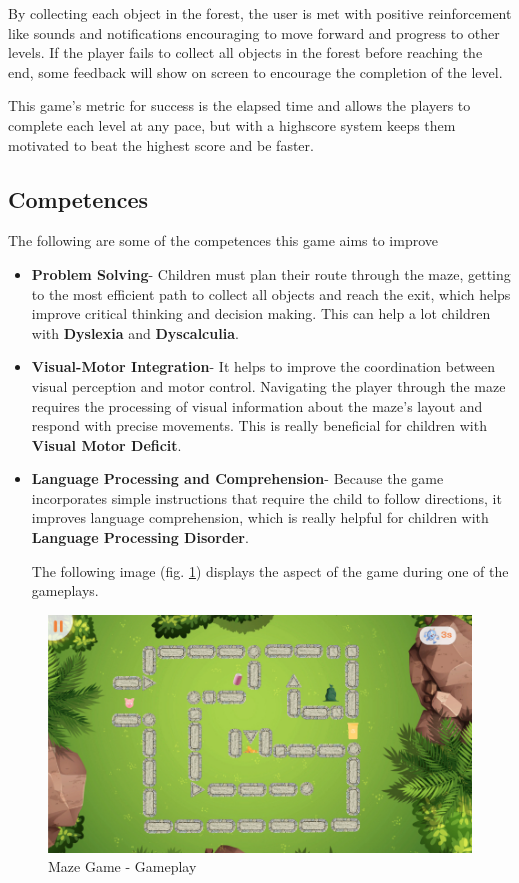 By collecting each object in the forest, the user is met with positive reinforcement like sounds and notifications encouraging to move forward and progress to other levels. If the player fails to collect all objects in the forest before reaching the end, some feedback will show on screen to encourage the completion of the level.

This game's metric for success is the elapsed time and allows the players to complete each level at any pace, but with a highscore system keeps them motivated to beat the highest score and be faster.

\subsection*{Competences}
The following are some of the competences this game aims to improve

\begin{itemize}
    \item \textbf{Problem Solving}- Children must plan their route through the maze, getting to the most efficient path to collect all objects and reach the exit, which helps improve critical thinking and decision making. This can help a lot children with \textbf{Dyslexia} and \textbf{Dyscalculia}.

    \item \textbf{Visual-Motor Integration}- It helps to improve the coordination between visual perception and motor control. Navigating the player through the maze requires the processing of visual information about the maze's layout and respond with precise movements. This is really beneficial for children with \textbf{Visual Motor Deficit}.
    
    \item \textbf{Language Processing and Comprehension}- Because the game incorporates simple instructions that require the child to follow directions, it improves language comprehension, which is really helpful for children with \textbf{Language Processing Disorder}.
    
    The following image (fig. \ref{fig:mazeGameplay}) displays the aspect of the game during one of the gameplays.
\end{itemize}

\begin{figure}[H]
    \centering
    \includegraphics[scale=0.45]{Chapters/gameplay/MazeGame.jpg}
    \caption{Maze Game - Gameplay}
    \label{fig:mazeGameplay}    
\end{figure}

